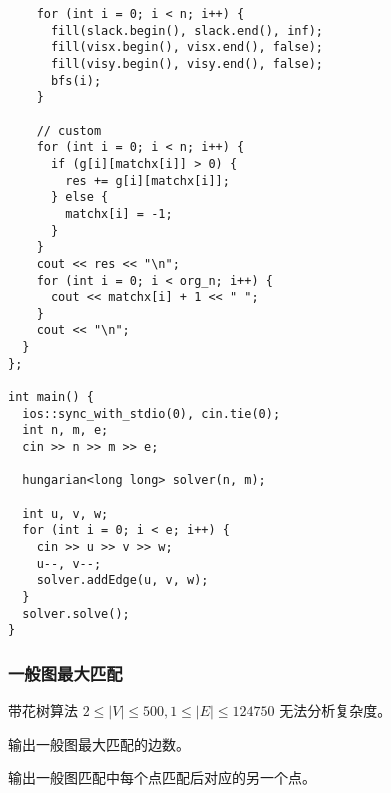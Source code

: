 \documentclass[UTF8]{ctexart}
\begin{document}
\begin{framed}
\begin{lstlisting}
    for (int i = 0; i < n; i++) {
      fill(slack.begin(), slack.end(), inf);
      fill(visx.begin(), visx.end(), false);
      fill(visy.begin(), visy.end(), false);
      bfs(i);
    }

    // custom
    for (int i = 0; i < n; i++) {
      if (g[i][matchx[i]] > 0) {
        res += g[i][matchx[i]];
      } else {
        matchx[i] = -1;
      }
    }
    cout << res << "\n";
    for (int i = 0; i < org_n; i++) {
      cout << matchx[i] + 1 << " ";
    }
    cout << "\n";
  }
};

int main() {
  ios::sync_with_stdio(0), cin.tie(0);
  int n, m, e;
  cin >> n >> m >> e;

  hungarian<long long> solver(n, m);

  int u, v, w;
  for (int i = 0; i < e; i++) {
    cin >> u >> v >> w;
    u--, v--;
    solver.addEdge(u, v, w);
  }
  solver.solve();
}

\end{lstlisting}
\end{framed}

\subsubsection{一般图最大匹配}
带花树算法 $2 \leq|V| \leq 500, 1 \leq |E| \leq 124750$ 无法分析复杂度。

输出一般图最大匹配的边数。

输出一般图匹配中每个点匹配后对应的另一个点。
\end{document}
